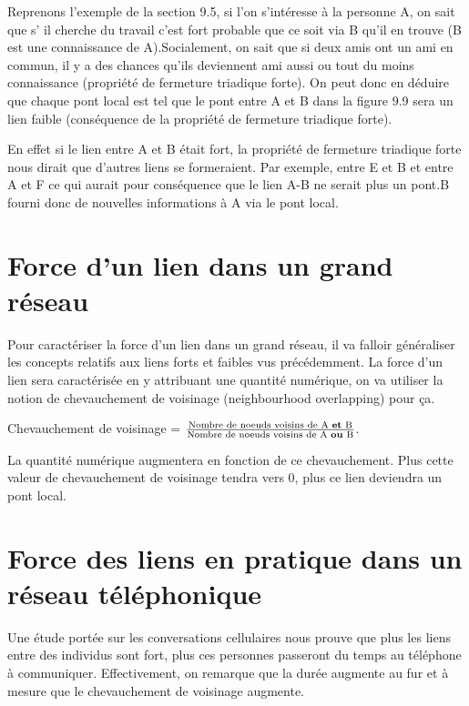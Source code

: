 Reprenons l'exemple de la section 9.5, si l'on s'intéresse à la personne A, on sait que s' il cherche du travail c'est fort probable que ce soit via B qu'il en trouve (B est une connaissance de A).Socialement, on sait que si deux amis ont un ami en commun, il y a des chances qu'ils deviennent ami aussi ou tout du moins connaissance (propriété de fermeture triadique forte). On peut donc en déduire que chaque pont local est tel que le pont entre A et B dans la figure 9.9 sera un lien faible (conséquence de la propriété de fermeture triadique forte).

En effet si le lien entre A et B était fort, la propriété de fermeture triadique forte nous dirait que d'autres liens se formeraient. Par exemple, entre E et B et entre A et F ce qui aurait pour conséquence que le lien A-B ne serait plus un pont.B fourni donc de nouvelles informations à A via le pont local.

\section{Force d'un lien dans un grand réseau}
Pour caractériser la force d'un lien dans un grand réseau, il va falloir généraliser les concepts relatifs aux liens forts et faibles vus précédemment.
La force d'un lien sera caractérisée en y attribuant une quantité numérique, on va utiliser la notion de chevauchement de voisinage (neighbourhood overlapping) pour ça.
\begin{center}
Chevauchement de voisinage = $\frac{\text{Nombre de noeuds voisins de A \textbf{et} B}}{\text{Nombre de noeuds voisins de A \textbf{ou} B}}$.\\
\end{center}
La quantité numérique augmentera en fonction de ce chevauchement. Plus cette valeur de chevauchement de voisinage tendra vers 0, plus ce lien deviendra un pont local.
\newline
\section*{Force des liens en pratique dans un réseau téléphonique}
Une étude portée sur les conversations cellulaires nous prouve que plus les liens entre des individus sont fort, plus ces personnes passeront du temps au téléphone à communiquer. Effectivement, on remarque que la durée augmente au fur et à mesure que le chevauchement de voisinage augmente.
\newline
